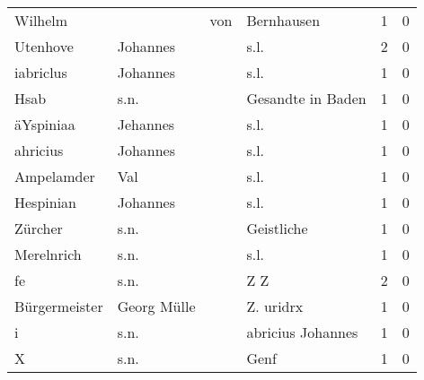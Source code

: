 \begin{tabular}{llllrr}
                  Wilhelm &                                    &         von &                                  Bernhausen &          1 &         0 \\
                 Utenhove &                           Johannes &             &                                        s.l. &          2 &         0 \\
                iabriclus &                           Johannes &             &                                        s.l. &          1 &         0 \\
                     Hsab &                               s.n. &             &                           Gesandte in Baden &          1 &         0 \\
                äYspiniaa &                           Jehannes &             &                                        s.l. &          1 &         0 \\
                 ahricius &                           Johannes &             &                                        s.l. &          1 &         0 \\
               Ampelamder &                                Val &             &                                        s.l. &          1 &         0 \\
                Hespinian &                           Johannes &             &                                        s.l. &          1 &         0 \\
                  Zürcher &                               s.n. &             &                                  Geistliche &          1 &         0 \\
               Merelnrich &                               s.n. &             &                                        s.l. &          1 &         0 \\
                       fe &                               s.n. &             &                                         Z Z &          2 &         0 \\
            Bürgermeister &                        Georg Mülle &             &                                   Z. uridrx &          1 &         0 \\
                        i &                               s.n. &             &                           abricius Johannes &          1 &         0 \\
                        X &                               s.n. &             &                                        Genf &          1 &         0 \\

\end{tabular}
